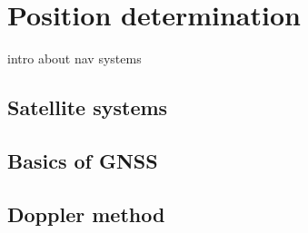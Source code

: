 \chapter{Position determination}
intro about nav systems

\section{Satellite systems}

\section{Basics of GNSS}

\section{Doppler method}




